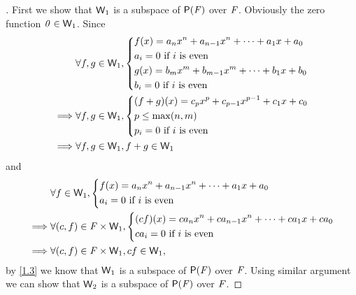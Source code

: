 \begin{proof}[]
  First we show that \(\mathsf{W}_1\) is a subspace of \(\ps{\F}\) over \(\mathit{F}\).
  Obviously the zero function \(\mathit{0} \in \mathsf{W}_1\).
  Since
  \begin{align*}
             & \forall f, g \in \mathsf{W}_1, \begin{dcases}
                                        f(x) = a_n x^n + a_{n - 1} x^n + \cdots + a_1 x + a_0 \\
                                        a_i = 0 \text{ if } i \text{ is even}                 \\
                                        g(x) = b_m x^m + b_{m - 1} x^m + \cdots + b_1 x + b_0 \\
                                        b_i = 0 \text{ if } i \text{ is even}
                                      \end{dcases}    \\
    \implies & \forall f, g \in \mathsf{W}_1, \begin{dcases}
                                        (f + g)(x) = c_p x^p + c_{p - 1} x^{p - 1} + c_1 x + c_0 \\
                                        p \leq \max(n, m)                                        \\
                                        p_i = 0 \text{ if } i \text{ is even}
                                      \end{dcases} \\
    \implies & \forall f, g \in \mathsf{W}_1, f + g \in \mathsf{W}_1
  \end{align*}
  and
  \begin{align*}
             & \forall f \in \mathsf{W}_1, \begin{dcases}
                                     f(x) = a_n x^n + a_{n - 1} x^n + \cdots + a_1 x + a_0 \\
                                     a_i = 0 \text{ if } i \text{ is even}
                                   \end{dcases}                       \\
    \implies & \forall (c, f) \in \mathit{F} \times \mathsf{W}_1, \begin{dcases}
                                                    (cf)(x) = ca_n x^n + ca_{n - 1} x^n + \cdots + ca_1 x + ca_0 \\
                                                    ca_i = 0 \text{ if } i \text{ is even}
                                                  \end{dcases} \\
    \implies & \forall (c, f) \in \mathit{F} \times \mathsf{W}_1, cf \in \mathsf{W}_1,
  \end{align*}
  by \cref{1.3} we know that \(\mathsf{W}_1\) is a subspace of \(\ps{\F}\) over \(\mathit{F}\).
  Using similar argument we can show that \(\mathsf{W}_2\) is a subspace of \(\ps{\F}\) over \(\mathit{F}\).


\end{proof}
